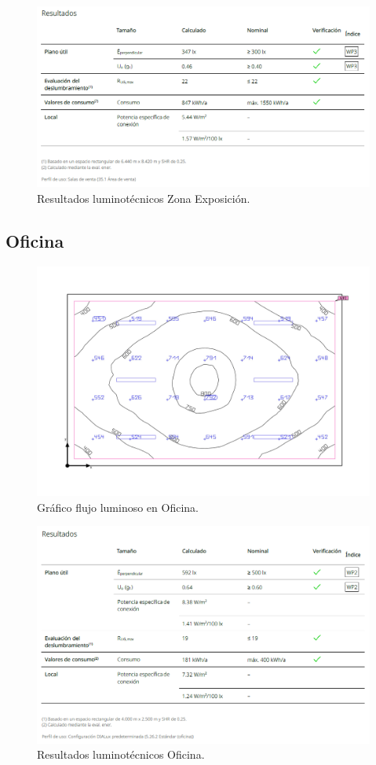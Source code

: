 \documentclass[../main.tex]{subfiles}
\begin{document}
\begin{figure}[H]
    \centering
    \includegraphics[width=0.75\linewidth]{Imagenes/Resultados Iluminacion Zona Exposicion.png}
    \caption{Resultados luminotécnicos Zona Exposición.}
\end{figure}

\subsection{Oficina}
\begin{figure}[H]
    \centering
    \includegraphics[width=0.5\linewidth]{Imagenes/Iluminacion Oficina.png}
    \caption{Gráfico flujo luminoso en Oficina.}
\end{figure}

\begin{figure}[H]
    \centering
    \includegraphics[width=0.75\linewidth]{Imagenes/Resultados Iluminacion Oficina.png}
    \caption{Resultados luminotécnicos Oficina.}
\end{figure}
\end{document}
